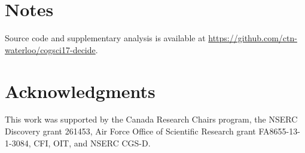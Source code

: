 \documentclass[10pt,letterpaper]{article}
\begin{document}
\section{Notes}
Source code and supplementary analysis is available at \url{https://github.com/ctn-waterloo/cogsci17-decide}.

\section{Acknowledgments}
This work was supported by the Canada Research Chairs program,
the NSERC Discovery grant 261453, Air Force Office of Scientific Research grant FA8655-13-1-3084, CFI, OIT, and NSERC CGS-D\@.  %



\setlength{\bibleftmargin}{.125in}
\setlength{\bibindent}{-\bibleftmargin}


\end{document}
